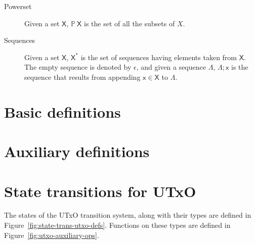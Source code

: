 \documentclass[11pt,a4paper]{article}
\newcommand{\powerset}[1]{\mathbb{P}~#1}
\newcommand{\type}[1]{\mathsf{#1}}
\newcommand{\seqof}[1]{#1^{*}}
\begin{document}
\begin{description}
\item[Powerset] Given a set $\type{X}$, $\powerset{\type{X}}$ is the set of all
  the subsets of $X$.
\item[Sequences] Given a set $\type{X}$, $\seqof{\type{X}}$ is the set of
  sequences having elements taken from $\type{X}$. The empty sequence is
  denoted by $\epsilon$, and given a sequence $\Lambda$, $\Lambda; \type{x}$ is
  the sequence that results from appending $\type{x} \in \type{X}$ to
  $\Lambda$.
\end{description}

\section{Basic definitions}
\label{sec:basic-definitions}

\section{Auxiliary definitions}
\label{sec:auxil-defin}

\section{State transitions for UTxO}
\label{sec:state-trans-utxo-1}

The states of the UTxO transition system, along with their types are defined in
Figure~\ref{fig:state-trans-utxo-defs}. Functions on these types are defined in
Figure~\ref{fig:utxo-auxiliary-ops}.
\end{document}
